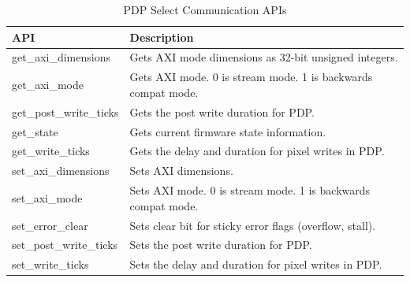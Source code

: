     \begin{table}
        \centering
        \small
        \begin{tabular}{| l l |}
            \hline
            API & Description \\ \hline
            get\_axi\_dimensions     & Gets AXI mode dimensions as 32-bit unsigned integers.        \\
            get\_axi\_mode           & Gets AXI mode. 0 is stream mode. 1 is backwards compat mode. \\
            get\_post\_write\_ticks  & Gets the post write duration for PDP.                        \\
            get\_state               & Gets current firmware state information.                     \\
            get\_write\_ticks        & Gets the delay and duration for pixel writes in PDP.         \\
            set\_axi\_dimensions     & Sets AXI dimensions.                                         \\
            set\_axi\_mode           & Sets AXI mode. 0 is stream mode. 1 is backwards compat mode. \\
            set\_error\_clear        & Sets clear bit for sticky error flags (overflow, stall).     \\
            set\_post\_write\_ticks  & Sets the post write duration for PDP.                        \\
            set\_write\_ticks        & Sets the delay and duration for pixel writes in PDP.         \\
            \hline
        \end{tabular}
        \caption{PDP Select Communication APIs}
        \label{tbl:apis}
    \end{table}

